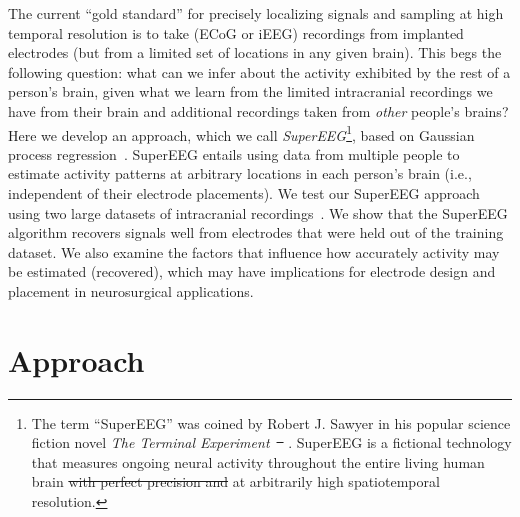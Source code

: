 \documentclass[11pt]{article}
\providecommand{\DIFaddtex}[1]{{\protect\color{blue}\uwave{#1}}} %
\providecommand{\DIFdeltex}[1]{{\protect\color{red}\sout{#1}}}                      %
\providecommand{\DIFaddbegin}{} %
\providecommand{\DIFaddend}{} %
\providecommand{\DIFdelbegin}{} %
\providecommand{\DIFdelend}{} %
\providecommand{\DIFadd}[1]{\texorpdfstring{\DIFaddtex{#1}}{#1}} %
\providecommand{\DIFdel}[1]{\texorpdfstring{\DIFdeltex{#1}}{}} %
\newcommand{\DIFscaledelfig}{0.5}
\newlength{\DIFdelgraphicswidth} %
\newlength{\DIFdelgraphicsheight} %
\newcommand{\DIFaddincludegraphics}[2][]{{\color{blue}\fbox{\DIFOincludegraphics[#1]{#2}}}} %
\newcommand{\DIFdelincludegraphics}[2][]{%
\sbox{\DIFdelgraphicsbox}{\DIFOincludegraphics[#1]{#2}}%
\settoboxwidth{\DIFdelgraphicswidth}{\DIFdelgraphicsbox} %
\settoboxtotalheight{\DIFdelgraphicsheight}{\DIFdelgraphicsbox} %
\scalebox{\DIFscaledelfig}{%
\parbox[b]{\DIFdelgraphicswidth}{\usebox{\DIFdelgraphicsbox}\\[-\baselineskip] \rule{\DIFdelgraphicswidth}{0em}}\llap{\resizebox{\DIFdelgraphicswidth}{\DIFdelgraphicsheight}{%
\setlength{\unitlength}{\DIFdelgraphicswidth}%
\begin{picture}(1,1)%
\thicklines\linethickness{2pt} %
{\color[rgb]{1,0,0}\put(0,0){\framebox(1,1){}}}%
{\color[rgb]{1,0,0}\put(0,0){\line( 1,1){1}}}%
{\color[rgb]{1,0,0}\put(0,1){\line(1,-1){1}}}%
\end{picture}%
}\hspace*{3pt}}} %
} %
\DeclareRobustCommand{\DIFaddbegin}{\DIFOaddbegin \let\includegraphics\DIFaddincludegraphics} %
\DeclareRobustCommand{\DIFaddend}{\DIFOaddend \let\includegraphics\DIFOincludegraphics} %
\DeclareRobustCommand{\DIFdelbegin}{\DIFOdelbegin \let\includegraphics\DIFdelincludegraphics} %
\DeclareRobustCommand{\DIFdelend}{\DIFOaddend \let\includegraphics\DIFOincludegraphics} %
\begin{document}
The current ``gold standard'' for precisely localizing signals and sampling at
high temporal resolution is to take (ECoG or iEEG) recordings from implanted
electrodes (but from a limited set of locations in any given brain).  This begs
the following question: what can we infer about the activity exhibited by the
rest of a person's brain, given what we learn from the limited intracranial
recordings we have from their brain and additional recordings taken from
\textit{other} people's brains?  Here we develop an approach, which we call
\textit{SuperEEG}\footnote{The term ``SuperEEG'' was coined by Robert J. Sawyer
in his popular science fiction novel \textit{The Terminal
Experiment}~\DIFdelbegin \DIFdel{\mbox{%
\cite{Sawy95}}\hspace{0pt}%
}\DIFdelend \DIFaddbegin \DIFadd{\mbox{%
\citep{Sawy95}}\hspace{0pt}%
}\DIFaddend .  SuperEEG is a fictional technology that measures
ongoing neural activity throughout the entire living human brain \DIFdelbegin \DIFdel{with perfect precision and
  }\DIFdelend at arbitrarily
high spatiotemporal resolution.}, based on Gaussian process
regression~\citep{Rasm06}.  SuperEEG entails using data from multiple people to
estimate activity patterns at arbitrary locations in each person's brain (i.e.,
independent of their electrode placements).  We test our SuperEEG approach using
two large datasets of intracranial recordings~\citep{SedeEtal03, SedeEtal07a,
SedeEtal07b, MannEtal11, MannEtal12, EzzyEtal17, HoraEtal17, KragEtal17,
KuceEtal17, LinEtal17, SoloEtal18, WeidEtal18, EzzyEtal18, KuceEtal18}.  We show
that the SuperEEG algorithm recovers signals well from electrodes that were held
out of the training dataset.  We also examine the factors that influence how
accurately activity may be estimated (recovered), which may have implications
for electrode design and placement in neurosurgical applications.

\section*{Approach}
\DIFaddbegin 
\end{document}
